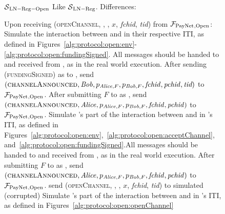   \begin{figure}[H]
    \begin{simulatorbox}{$\mathcal{S}{}_{\mathrm{LN - Reg - Open}}$}
      Like $\mathcal{S}{}_{\mathrm{LN - Reg}}$. Differences:
      \begin{algorithmic}[1]
        \State Upon receiving (\textsc{openChannel}, \alice, \bob, $x$,
        \textit{fchid}, \textit{tid}) from $\mathcal{F}_{\mathrm{PayNet}}{}_{\mathrm{, Open}}$:
        \Indent
            \State Simulate the interaction between \alice{} and \bob{} in their
            respective ITI, as defined in
            Figures~\ref{alg:protocol:open:env}-\ref{alg:protocol:open:fundingSigned}.
            All messages should be handed to and received from \adversary, as in
            the real world execution.
            \State After sending (\textsc{fundingSigned}) as \bob{} to \alice,
            send $\left(\textsc{channelAnnounced}, \mathit{Bob}, p_{\mathit{Alice}, F}, p_{\mathit{Bob},
            F}, \mathit{fchid}, \mathit{pchid}, \textit{tid}\right)$ to
            $\mathcal{F}_{\mathrm{PayNet}}{}_{\mathrm{, Open}}$.
            \label{alg:sim:open:announced:bob:bothhonest}
            \State After submitting $F$ to \ledger{} as \alice, send
            $\left(\textsc{channelAnnounced}, \mathit{Alice}, p_{\mathit{Alice}, F}, p_{\mathit{Bob},
            F}, \mathit{fchid}, \mathit{pchid}\right)$ to $\mathcal{F}_{\mathrm{PayNet}}{}_{\mathrm{,
            Open}}$.
            \label{alg:sim:open:announced:alice:bothhonest}
            \State Simulate \alice's part of the interaction between \alice{}
            and \bob{} in \alice's ITI, as defined in
            Figures~\ref{alg:protocol:open:env},~\ref{alg:protocol:open:acceptChannel},
            and~\ref{alg:protocol:open:fundingSigned}.All messages should be
            handed to and received from \adversary, as in the real world
            execution.
            \State After submitting $F$ to \ledger{} as \alice, send
            $\left(\textsc{channelAnnounced}, \mathit{Alice}, p_{\mathit{Alice}, F}, p_{\mathit{Bob},
            F}, \mathit{fchid}, \mathit{pchid}\right)$ to $\mathcal{F}_{\mathrm{PayNet}}{}_{\mathrm{,
            Open}}$.
            \label{alg:sim:open:announced:alice:alicehonest}
            \State send (\textsc{openChannel}, \alice, \bob, $x$,
            \textit{fchid}, \textit{tid}) to simulated (corrupted) \alice
            \State Simulate \bob's part of the interaction between \alice{}
            and \bob{} in \bob's ITI, as defined in
            Figures~\ref{alg:protocol:open:openChannel}

\end{algorithmic}
\end{simulatorbox}
\end{figure}
